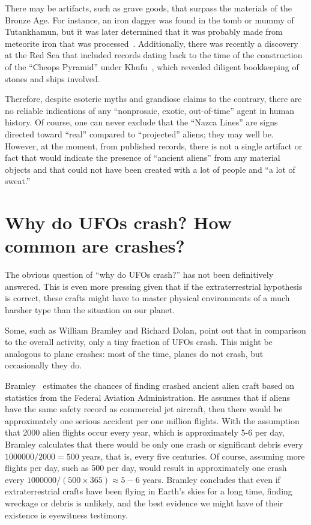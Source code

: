 There may be artifacts, such as grave goods, that surpass the materials of the Bronze Age. For instance, an iron dagger was found in the tomb or mummy of Tutankhamun, but it was later determined that it was probably made from meteorite iron that was processed~\cite{Wertime1980Jan,Wertime1973Nov,Matsui2022Apr}. Additionally, there was recently a discovery at the Red Sea that included records dating back to the time of the construction of the ``Cheops Pyramid'' under Khufu~\cite{Tallet2016,Tallet2017,Tallet2021}, which revealed diligent bookkeeping of stones and ships involved.

Therefore, despite esoteric myths and grandiose claims to the contrary, there are no reliable indications of any ``nonprosaic, exotic, out-of-time'' agent in human history. Of course, one can never exclude that the ``Nazca Lines'' are signs directed toward ``real'' compared to ``projected'' aliens; they may well be. However, at the moment, from published records, there is not a single artifact or fact that would indicate the presence of ``ancient aliens'' from any material objects and that could not have been created with a lot of people and ``a lot of sweat.''



\section{Why do UFOs crash? How common are crashes?}
\label{2023-UFO-part-Perception-crash-retreivals-wduc}

The obvious question of ``why do UFOs crash?'' has not been definitively answered. This is even more pressing given that if the extraterrestrial hypothesis is correct, these crafts might have to master physical environments of a much harsher type than the situation on our planet.

Some, such as William Bramley and Richard Dolan, point out that in comparison to the overall activity, only a tiny fraction of UFOs crash. This might be analogous to plane crashes: most of the time, planes do not crash, but occasionally they do.

Bramley~\cite[pp.~18-19]{Bramley1993Mar} estimates the chances of finding crashed ancient alien craft based on statistics from the Federal Aviation Administration. He assumes that if aliens have the same safety record as commercial jet aircraft, then there would be approximately one serious accident per one million flights. With the assumption that 2000 alien flights occur every year, which is approximately 5-6 per day, Bramley calculates that there would be only one crash or significant debris every $1000000/2000 = 500$ years, that is, every five centuries. Of course, assuming more flights per day, such as 500 per day, would result in approximately one crash every $1000000/(500 \times 365) \approx 5-6$ years. Bramley concludes that even if extraterrestrial crafts have been flying in Earth's skies for a long time, finding wreckage or debris is unlikely, and the best evidence we might have of their existence is eyewitness testimony.

